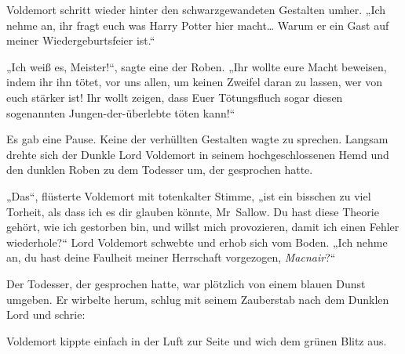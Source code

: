 Voldemort schritt wieder hinter den schwarzgewandeten Gestalten umher.
„Ich nehme an, ihr fragt euch was Harry Potter hier macht… Warum er ein Gast auf meiner Wiedergeburtsfeier ist.“

„Ich weiß es, Meister!“, sagte eine der Roben. „Ihr wollte eure Macht beweisen, indem ihr ihn tötet, vor uns allen, um keinen Zweifel daran zu lassen, wer von euch stärker ist! Ihr wollt zeigen, dass Euer Tötungsfluch sogar diesen sogenannten Jungen-der-überlebte töten kann!“

Es gab eine Pause.
Keine der verhüllten Gestalten wagte zu sprechen.
Langsam drehte sich der Dunkle Lord Voldemort in seinem hochgeschlossenen Hemd und den dunklen Roben zu dem Todesser um, der gesprochen hatte.

„Das“, flüsterte Voldemort mit totenkalter Stimme, „ist ein bisschen zu viel Torheit, als dass ich es dir glauben könnte, Mr~Sallow. Du hast diese Theorie gehört, wie ich gestorben bin, und willst mich provozieren, damit ich einen Fehler wiederhole?“
Lord Voldemort schwebte und erhob sich vom Boden.
„Ich nehme an, du hast deine Faulheit meiner Herrschaft vorgezogen, \emph{Macnair}?“

Der Todesser, der gesprochen hatte, war plötzlich von einem blauen Dunst umgeben. Er wirbelte herum, schlug mit seinem Zauberstab nach dem Dunklen Lord und schrie: 

Voldemort kippte einfach in der Luft zur Seite und wich dem grünen Blitz aus.


